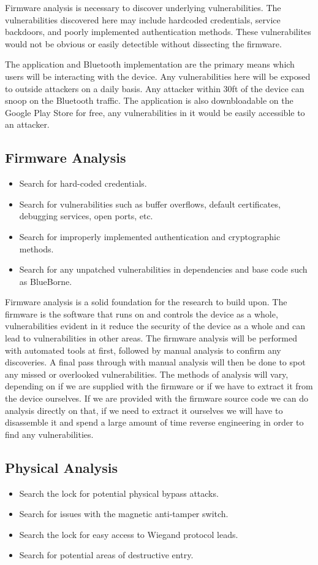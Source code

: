 \documentclass[10pt,twocolumn,letterpaper]{article}
\begin{document}
Firmware analysis is necessary to discover underlying vulnerabilities.  The vulnerabilities discovered here may include hardcoded credentials, service backdoors, and poorly implemented authentication methods.  These vulnerabilites would not be obvious or easily detectible without dissecting the firmware.

The application and Bluetooth implementation are the primary means which users will be interacting with the device.  Any vulnerabilities here will be exposed to outside attackers on a daily basis.  Any attacker within 30ft of the device can snoop on the Bluetooth traffic.  The application is also downbloadable on the Google Play Store for free, any vulnerabilities in it would be easily accessible to an attacker.

\subsection{Firmware Analysis}
\begin{itemize}
    \item Search for hard-coded credentials.
    \item Search for vulnerabilities such as buffer overflows, default certificates, debugging services, open ports, etc.
    \item Search for improperly implemented authentication and cryptographic methods.
    \item Search for any unpatched vulnerabilities in dependencies and base code such as BlueBorne.
\end{itemize}

Firmware analysis is a solid foundation for the research to build upon.  The firmware is the software that runs on and controls the device as a whole, vulnerabilities evident in it reduce the security of the device as a whole and can lead to vulnerabilities in other areas.  The firmware analysis will be performed with automated tools at first, followed by manual analysis to confirm any discoveries.  A final pass through with manual analysis will then be done to spot any missed or overlooked vulnerabilities.  The methods of analysis will vary, depending on if we are supplied with the firmware or if we have to extract it from the device ourselves.  If we are provided with the firmware source code we can do analysis directly on that, if we need to extract it ourselves we will have to disassemble it and spend a large amount of time reverse engineering in order to find any vulnerabilities.


\subsection{Physical Analysis}
\begin{itemize}
    \item Search the lock for potential physical bypass attacks.
    \item Search for issues with the magnetic anti-tamper switch.
    \item Search the lock for easy access to Wiegand protocol leads.
    \item Search for potential areas of destructive entry.
\end{itemize}
\end{document}
